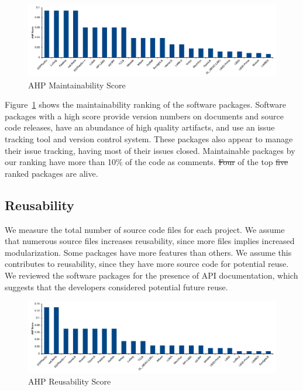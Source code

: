 \documentclass[final, 3p, times, authoryear]{elsarticle}
\providecommand{\DIFaddtex}[1]{{\protect\color{blue}\uwave{#1}}} %
\providecommand{\DIFdeltex}[1]{{\protect\color{red}\sout{#1}}}                      %
\providecommand{\DIFaddbegin}{} %
\providecommand{\DIFaddend}{} %
\providecommand{\DIFdelbegin}{} %
\providecommand{\DIFdelend}{} %
\providecommand{\DIFadd}[1]{\texorpdfstring{\DIFaddtex{#1}}{#1}} %
\providecommand{\DIFdel}[1]{\texorpdfstring{\DIFdeltex{#1}}{}} %
\begin{document}
\begin{figure}[h!]
	\begin{center}
		\includegraphics[width=1.0\textwidth]{./figures/maintainability_chart.pdf}
		\caption{AHP Maintainability Score}
		\label{Fig_Maintainability}
	\end{center}
\end{figure}

Figure~\ref{Fig_Maintainability} shows the maintainability ranking of the
software packages. Software packages with a high score provide version numbers
on documents and source code releases, have an abundance of high quality
artifacts, and use an issue tracking tool and version control system. These
packages also appear to manage their issue tracking, having most of their issues
closed. Maintainable packages by our ranking have more than 10\% of the code as
comments. \DIFdelbegin \DIFdel{Four }\DIFdelend \DIFaddbegin \DIFadd{All }\DIFaddend of the top \DIFdelbegin \DIFdel{five }\DIFdelend \DIFaddbegin \DIFadd{four }\DIFaddend ranked packages are alive.

\subsection{Reusability} \label{reusabilityresults}

We measure the total number of source code files for each project. We assume
that numerous source files increases reusability, since more files implies
increased modularization. Some packages have more features than others.  We
assume this contributes to reusability, since they have more source code for
potential reuse. We reviewed the software packages for the presence of API
documentation, which suggests that the developers considered potential future
reuse. 

\begin{figure}[h!]
	\begin{center}
		\includegraphics[width=1.0\textwidth]{./figures/reusability_chart.pdf}
		\caption{AHP Reusability Score}
		\label{Fig_Reusabilty}
	\end{center}
\end{figure}
\end{document}
